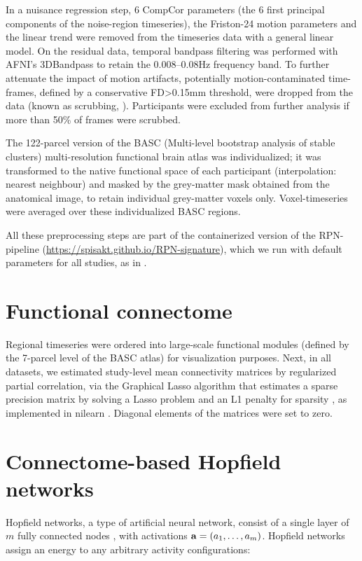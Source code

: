 \documentclass{article}
\begin{document}
In a nuisance regression step, 6 CompCor parameters (the 6 first principal components of the noise-region timeseries), the Friston-24 motion parameters and the linear trend were removed from the timeseries data with a general linear model. On the residual data, temporal bandpass filtering was performed with AFNI's 3DBandpass to retain the 0.008--0.08Hz frequency band. To further attenuate the impact of motion artifacts, potentially motion-contaminated time-frames, defined by a conservative FD\textgreater 0.15mm threshold, were dropped from the data (known as scrubbing, \cite{satterthwaite2013improved}). Participants were excluded from further analysis if more than 50\% of frames were scrubbed.

The 122-parcel version of the BASC (Multi-level bootstrap analysis of stable clusters) multi-resolution functional brain atlas \citep{bellec2010multi} was individualized; it was transformed to the native functional space of each participant (interpolation: nearest neighbour) and masked by the grey-matter mask obtained from the anatomical image, to retain individual grey-matter voxels only. Voxel-timeseries were averaged over these individualized BASC regions.

All these preprocessing steps are part of the containerized version of the RPN-pipeline (\href{https://spisakt.github.io/RPN-signature}{https://spisakt.github.io/RPN-signature}), which we run with default parameters for all studies, as in \cite{Spisak_2020}.

\section{Functional connectome}

Regional timeseries were ordered into large-scale functional modules (defined by the 7-parcel level of the BASC atlas) for visualization purposes.
Next, in all datasets, we estimated study-level mean connectivity matrices by regularized partial correlation, via the Graphical Lasso algorithm that estimates a sparse precision matrix by solving a Lasso problem and an L1 penalty for sparsity \citep{varoquaux2010detection}, as implemented in nilearn \citep{abraham2014machine}.  Diagonal elements of the matrices were set to zero.

\section{Connectome-based Hopfield networks}

Hopfield networks, a type of artificial neural network, consist of a single layer of $m$ fully connected nodes \citep{hopfield1982neural}, with activations $\bold{a} = (a_1, \dots, a_m )$. Hopfield networks assign an energy to any arbitrary activity configurations:
\end{document}
